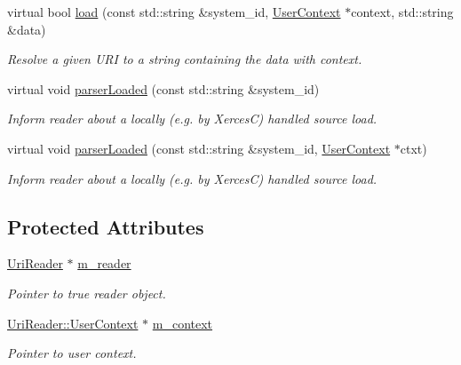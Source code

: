 \begin{DoxyCompactItemize}
virtual bool \hyperlink{class_d_d4hep_1_1_x_m_l_1_1_uri_context_reader_a4a092a836c08154d7d787f9244701944}{load} (const std::string \&system\_\-id, \hyperlink{struct_d_d4hep_1_1_x_m_l_1_1_uri_reader_1_1_user_context}{UserContext} $\ast$context, std::string \&data)
\begin{DoxyCompactList}\small\item\em Resolve a given URI to a string containing the data with context. \item\end{DoxyCompactList}\item 
virtual void \hyperlink{class_d_d4hep_1_1_x_m_l_1_1_uri_context_reader_ae3ec9a7f4f18adf4dcac1d894453dbd0}{parserLoaded} (const std::string \&system\_\-id)
\begin{DoxyCompactList}\small\item\em Inform reader about a locally (e.g. by XercesC) handled source load. \item\end{DoxyCompactList}\item 
virtual void \hyperlink{class_d_d4hep_1_1_x_m_l_1_1_uri_context_reader_ad55127447ec6782a4bf610ea2a33e233}{parserLoaded} (const std::string \&system\_\-id, \hyperlink{struct_d_d4hep_1_1_x_m_l_1_1_uri_reader_1_1_user_context}{UserContext} $\ast$ctxt)
\begin{DoxyCompactList}\small\item\em Inform reader about a locally (e.g. by XercesC) handled source load. \item\end{DoxyCompactList}\end{DoxyCompactItemize}
\subsection*{Protected Attributes}
\begin{DoxyCompactItemize}
\item 
\hyperlink{class_d_d4hep_1_1_x_m_l_1_1_uri_reader}{UriReader} $\ast$ \hyperlink{class_d_d4hep_1_1_x_m_l_1_1_uri_context_reader_a55aeba72e0e3b7ca7699c1b9fa439da8}{m\_\-reader}
\begin{DoxyCompactList}\small\item\em Pointer to true reader object. \item\end{DoxyCompactList}\item 
\hyperlink{struct_d_d4hep_1_1_x_m_l_1_1_uri_reader_1_1_user_context}{UriReader::UserContext} $\ast$ \hyperlink{class_d_d4hep_1_1_x_m_l_1_1_uri_context_reader_ac95a39733d67430a8faa6427f750e448}{m\_\-context}
\begin{DoxyCompactList}\small\item\em Pointer to user context. \item\end{DoxyCompactList}\end{DoxyCompactItemize}


